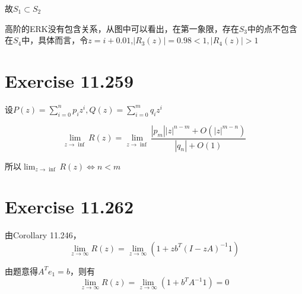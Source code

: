 \documentclass[twoside,a4paper]{article}
\begin{document}
 故$S_1\subset  S_2$
 
 高阶的ERK没有包含关系，从图中可以看出，在第一象限，存在$S_3$中的点不包含在$S_4$中，具体而言，令$z=i+0.01$,$|R_3(z)|=0.98<1,|R_4(z)|>1$

 
 \section{Exercise 11.259}
设$P(z)=\sum_{i=0}^np_iz^i,Q(z)=\sum_{i=0}^mq_iz^i$

 $$\lim_{z\rightarrow \inf}R(z)=\lim_{z\rightarrow \inf}\frac{|p_m||z|^{n-m}+O(|z|^{m-n})}{|q_n|+O(1)}$$

 所以$\lim_{z\rightarrow \inf}R(z) \Leftrightarrow n<m$

 
 \section{Exercise 11.262}
 由Corollary 11.246，$$\lim_{z\rightarrow \infty}R(z)=\lim_{z\rightarrow \infty}(1+zb^T(I-zA)^{-1}1)$$

   由题意得$A^Te_1=b$，则有$$\lim_{z\rightarrow \infty}R(z)=\lim_{z\rightarrow \infty}(1+b^TA^{-1}1)=0$$
 
\end{document}
